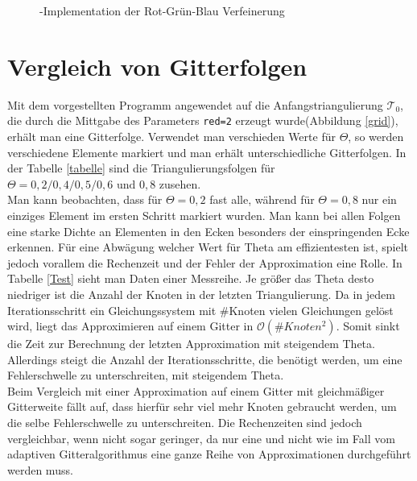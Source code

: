 \begin{figure}[!htbp]
	
	\caption{\label{redref} \matlab-Implementation der Rot-Grün-Blau Verfeinerung}
\end{figure}
\newpage \newpage \newpage  
\section{Vergleich von Gitterfolgen}
Mit dem vorgestellten \matlab \:Programm angewendet auf die Anfangstriangulierung $\mathscr{T}_0$, die durch die Mittgabe des Parameters \texttt{red=2} erzeugt wurde(Abbildung \ref{grid}), erhält man eine Gitterfolge. Verwendet man verschieden Werte für $\Theta$, so werden verschiedene Elemente markiert und man erhält unterschiedliche Gitterfolgen. In der Tabelle \ref{tabelle} sind die Triangulierungsfolgen für $\Theta =0,2/0,4/0,5/0,6 \text{ und } 0,8$ zusehen. \\
Man kann beobachten, dass für $\Theta = 0,2$ fast alle, während für $\Theta = 0,8$ nur ein einziges Element im ersten Schritt markiert wurden. Man kann bei allen Folgen eine starke Dichte an Elementen in den Ecken besonders der einspringenden Ecke erkennen. Für eine Abwägung welcher Wert für Theta am effizientesten ist, spielt jedoch vorallem die Rechenzeit und der Fehler der Approximation eine Rolle. In Tabelle \ref{Test} sieht man Daten einer Messreihe. Je größer das Theta desto niedriger ist die Anzahl der Knoten in der letzten Triangulierung. Da in jedem Iterationsschritt ein Gleichungssystem mit \#Knoten vielen Gleichungen gelöst wird, liegt das Approximieren auf einem Gitter in $\mathcal{O}(\#Knoten^2)$. Somit sinkt die Zeit zur Berechnung der letzten Approximation mit steigendem Theta. Allerdings steigt die Anzahl der Iterationsschritte, die benötigt werden, um eine Fehlerschwelle zu unterschreiten, mit steigendem Theta.\\
Beim Vergleich mit einer Approximation auf einem Gitter mit gleichmäßiger Gitterweite fällt auf, dass hierfür sehr viel mehr Knoten gebraucht werden, um die selbe Fehlerschwelle zu unterschreiten. Die Rechenzeiten sind jedoch vergleichbar, wenn nicht sogar geringer, da nur eine und nicht wie im Fall vom adaptiven Gitteralgorithmus eine ganze Reihe von Approximationen durchgeführt werden muss.\\
